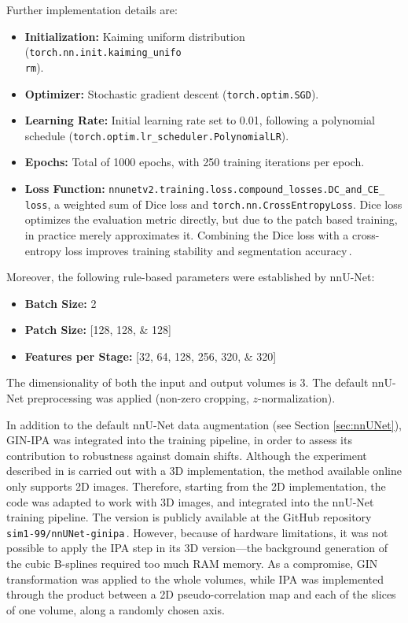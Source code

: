 Further implementation details are:
\begin{itemize}
    \item \textbf{Initialization:} Kaiming uniform distribution (\texttt{torch.nn.init.kaiming\_unifo\\
    rm}).
    \item \textbf{Optimizer:} Stochastic gradient descent (\texttt{torch.optim.SGD}).
    \item \textbf{Learning Rate:} Initial learning rate set to \num{0.01}, following a polynomial schedule (\texttt{torch.optim.lr\_scheduler.PolynomialLR}).
    \item \textbf{Epochs:} Total of \num{1000} epochs, with \num{250} training iterations per epoch.
    \item \textbf{Loss Function:} \texttt{nnunetv2.training.loss.compound\_losses.DC\_and\_CE\_\\
    loss}, a weighted sum of Dice loss and \texttt{torch.nn.CrossEntropyLoss}. Dice loss optimizes the evaluation metric directly, but due to the patch based training, in practice merely approximates it. Combining the Dice loss with a cross-entropy loss improves training stability and segmentation accuracy\,\cite{Isensee2021}.
\end{itemize}

Moreover, the following rule-based parameters were established by nnU-Net:
\begin{itemize}
    \item \textbf{Batch Size:} \num{2}
    \item \textbf{Patch Size:} [\numlist[list-final-separator = {, }]{128;128;128}]
    \item \textbf{Features per Stage:} [\numlist[list-final-separator = {, }]{32;64;128;256;320;320}]
\end{itemize}
The dimensionality of both the input and output volumes is \num{3}. The default nnU-Net preprocessing was applied (non-zero cropping, $z$-normalization).

In addition to the default nnU-Net data augmentation (see Section \ref{sec:nnUNet}), GIN-IPA was integrated into the training pipeline, in order to assess its contribution to robustness against domain shifts. Although the experiment described in \cite{Ouyang2023} is carried out with a 3D implementation, the method available online only supports 2D images. Therefore, starting from the 2D implementation, the code was adapted to work with 3D images, and integrated into the nnU-Net training pipeline. The version is publicly available at the GitHub repository \texttt{sim1-99/nnUNet-ginipa}\,\cite{nnUNet-ginipa}. However, because of hardware limitations, it was not possible to apply the IPA step in its 3D version---the background generation of the cubic B-splines required too much RAM memory. As a compromise, GIN transformation was applied to the whole volumes, while IPA was implemented through the product between a 2D pseudo-correlation map and each of the slices of one volume, along a randomly chosen axis.

